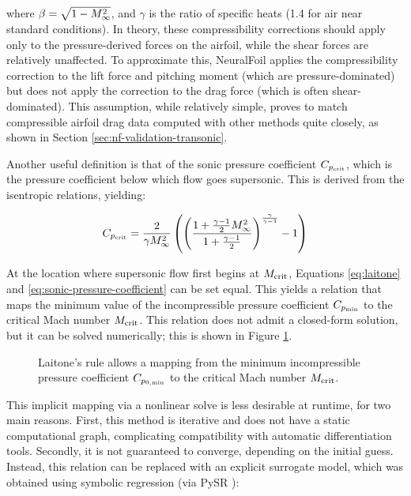 \noindent where $\beta = \sqrt{1- M_\infty^2}$, and $\gamma$ is the ratio of specific heats (1.4 for air near standard conditions). In theory, these compressibility corrections should apply only to the pressure-derived forces on the airfoil, while the shear forces are relatively unaffected. To approximate this, NeuralFoil applies the compressibility correction to the lift force and pitching moment (which are pressure-dominated) but does not apply the correction to the drag force (which is often shear-dominated). This assumption, while relatively simple, proves to match compressible airfoil drag data computed with other methods quite closely, as shown in Section \ref{sec:nf-validation-transonic}.

Another useful definition is that of the sonic pressure coefficient $C_{p_{\rm crit}}$, which is the pressure coefficient below which flow goes supersonic. This is derived from the isentropic relations, yielding:

\begin{equation}
    C_{p_{\rm crit}} = \frac{2}{\gamma M_\infty^{2}} \left(
    \left(
    \frac{1 + \frac{\gamma - 1}{2} M_\infty^{2}}{1 + \frac{\gamma - 1}{2}}
    \right)^{\frac{\gamma}{\gamma - 1}}
    - 1
    \right)
    \label{eq:sonic-pressure-coefficient}
\end{equation}

At the location where supersonic flow first begins at $M_{\rm crit}$, Equations \ref{eq:laitone} and \ref{eq:sonic-pressure-coefficient} can be set equal. This yields a relation that maps the minimum value of the incompressible pressure coefficient $C_{p_{\rm min}}$ to the critical Mach number $M_{\rm crit}$. This relation does not admit a closed-form solution, but it can be solved numerically; this is shown in Figure \ref{fig:compressibility_corrections}.

\begin{figure}[H]
    \centering
    
    \caption{Laitone's rule allows a mapping from the minimum incompressible pressure coefficient $C_{p_{0,\rm min}}$ to the critical Mach number $M_{\rm crit}$.}
    \label{fig:compressibility_corrections}
\end{figure}

This implicit mapping via a nonlinear solve is less desirable at runtime, for two main reasons. First, this method is iterative and does not have a static computational graph, complicating compatibility with automatic differentiation tools. Secondly, it is not guaranteed to converge, depending on the initial guess. Instead, this relation can be replaced with an explicit surrogate model, which was obtained using symbolic regression (via PySR \cite{cranmer_interpretable_2023}):

